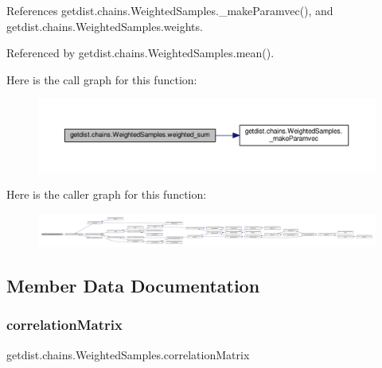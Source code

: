 References getdist.\+chains.\+Weighted\+Samples.\+\_\+make\+Paramvec(), and getdist.\+chains.\+Weighted\+Samples.\+weights.



Referenced by getdist.\+chains.\+Weighted\+Samples.\+mean().

Here is the call graph for this function\+:
\nopagebreak
\begin{figure}[H]
\begin{center}
\leavevmode
\includegraphics[width=350pt]{classgetdist_1_1chains_1_1WeightedSamples_afdeb6d07f1db505f36fe0ca0052528ac_cgraph}
\end{center}
\end{figure}
Here is the caller graph for this function\+:
\nopagebreak
\begin{figure}[H]
\begin{center}
\leavevmode
\includegraphics[width=350pt]{classgetdist_1_1chains_1_1WeightedSamples_afdeb6d07f1db505f36fe0ca0052528ac_icgraph}
\end{center}
\end{figure}


\subsection{Member Data Documentation}
\mbox{\label{classgetdist_1_1chains_1_1WeightedSamples_afa743b2a9422d70b91370c7b27c2e163}} 
\subsubsection{\texorpdfstring{correlation\+Matrix}{correlationMatrix}}
{\footnotesize\ttfamily getdist.\+chains.\+Weighted\+Samples.\+correlation\+Matrix}



